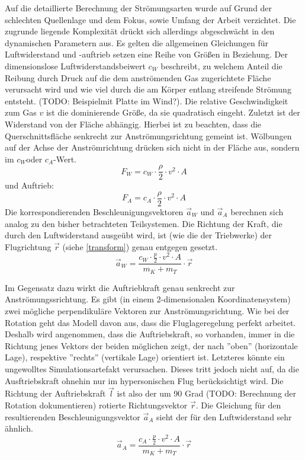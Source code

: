 Auf die detaillierte Berechnung der Strömungsarten wurde auf Grund der schlechten Quellenlage und dem Fokus, sowie Umfang der Arbeit verzichtet. Die zugrunde liegende Komplexität drückt sich allerdings abgeschwächt in den dynamischen Parametern aus. Es gelten die allgemeinen Gleichungen für Luftwiderstand und -auftrieb setzen eine Reihe von Größen in Beziehung. Der dimensionslose Luftwiderstandsbeiwert $c_W$ beschreibt, zu welchem Anteil die Reibung durch Druck auf die dem anströmenden Gas zugerichtete Fläche verursacht wird  und wie viel durch die am Körper entlang streifende Strömung entsteht. (TODO: Beispielmit Platte im Wind?). Die relative Geschwindigkeit zum Gas $v$ ist die dominierende Größe, da sie quadratisch eingeht. Zuletzt ist der Widerstand von der Fläche abhängig. Hierbei ist zu beachten, dass die Querschnittsfläche senkrecht zur Anströmungsrichtung gemeint ist. Wölbungen auf der Achse der Anströmrichtung drücken sich nicht in der Fläche aus, sondern im $c_W$oder $c_A$-Wert.
$$ F_W = c_W \cdot \frac{\rho}{2} \cdot v^{2} \cdot A $$
und Auftrieb:
$$ F_A = c_A \cdot \frac{\rho}{2} \cdot v^{2} \cdot A $$
Die korrespondierenden Beschleunigungsvektoren $\vec a_W$ und $\vec a_A$ berechnen sich analog zu den bisher betrachteten Teilsystemen. Die Richtung der Kraft, die durch den Luftwiderstand ausgeübt wird, ist (wie die der Triebwerke) der Flugrichtung $\vec r$ (siehe \ref{transform}) genau entgegen gesetzt.
$$ \vec a_W = \frac{c_W \cdot \frac{p}{2} \cdot v^{2} \cdot A}{m_K + m_T} \cdot \vec r $$

Im Gegensatz dazu wirkt die Auftriebkraft genau senkrecht zur Anströmungssrichtung. Es gibt (in einem 2-dimensionalen Koordinatensystem) zwei mögliche perpendikuläre Vektoren zur Anströmungsrichtung. Wie bei der Rotation geht das Modell davon aus, dass die Fluglageregelung perfekt arbeitet. Deshalb wird angenommen, dass die Auftriebskraft, so vorhanden, immer in die Richtung jenes Vektors der beiden möglichen zeigt, der nach ''oben'' (horizontale Lage), respektive ''rechts'' (vertikale Lage) orientiert ist. Letzteres könnte ein ungewolltes Simulationsartefakt verursachen. Dieses tritt jedoch nicht auf, da die Ausftriebskraft ohnehin nur im hypersonischen Flug berücksichtigt wird. Die Richtung der Auftriebskraft $\vec l$ ist also der um 90 Grad (TODO: Berechnung der Rotation dokumentieren) rotierte Richtungsvektor $\vec r$. Die Gleichung für den resultierenden Beschleunigungsvektor $\vec a_A$ sieht der für den Luftwiderstand sehr ähnlich.
$$ \vec a_A = \frac{c_A \cdot \frac{p}{2} \cdot v^{2} \cdot A}{m_K + m_T} \cdot \vec r$$